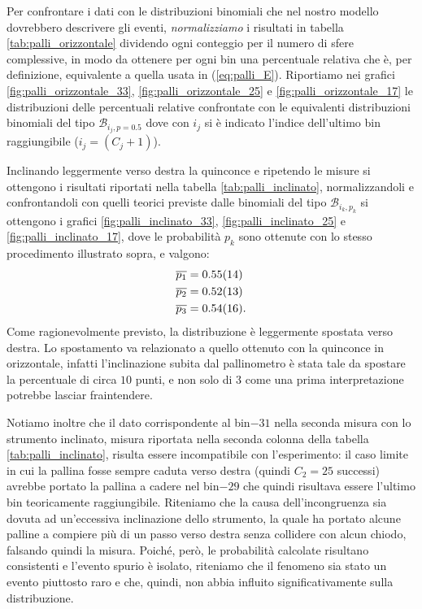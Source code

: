 \documentclass[10pt,oneside,a4paper]{article}
\begin{document}
Per confrontare i dati con le distribuzioni binomiali che nel nostro modello dovrebbero descrivere gli eventi, \emph{normalizziamo} i risultati in tabella \ref{tab:palli_orizzontale} dividendo ogni conteggio per il numero di sfere complessive, in modo da ottenere per ogni bin una percentuale relativa che è, per definizione, equivalente a quella usata in (\ref{eq:palli_E}). Riportiamo nei grafici \ref{fig:palli_orizzontale_33}, \ref{fig:palli_orizzontale_25} e \ref{fig:palli_orizzontale_17} le distribuzioni delle percentuali relative confrontate con le equivalenti distribuzioni binomiali del tipo $\mathscr{B}_{i_j, p=0.5}$ dove con $i_j$ si è indicato l'indice dell'ultimo bin raggiungibile ($i_j = (C_j+1)$).

Inclinando leggermente verso destra la quinconce e ripetendo le misure si ottengono i risultati riportati nella tabella \ref{tab:palli_inclinato}, normalizzandoli e confrontandoli con quelli teorici previste dalle binomiali del tipo $\mathscr{B}_{i_k, p_k}$ si ottengono i grafici \ref{fig:palli_inclinato_33}, \ref{fig:palli_inclinato_25} e \ref{fig:palli_inclinato_17}, dove le probabilità $p_k$ sono ottenute con lo stesso procedimento illustrato sopra, e valgono:
\begin{align*}
	& \overline{p_1} = \SI{0.55 \pm 0.14}{} \\ 
	& \overline{p_2} = \SI{0.52 \pm 0.13}{} \\
	& \overline{p_3} = \SI{0.54 \pm 0.16}{}.
\end{align*}
Come ragionevolmente previsto, la distribuzione è leggermente spostata verso destra. Lo spostamento va relazionato a quello ottenuto con la quinconce in orizzontale, infatti l'inclinazione subita dal pallinometro è stata tale da spostare la percentuale di circa $10$ punti, e non solo di $3$ come una prima interpretazione potrebbe lasciar fraintendere.

Notiamo inoltre che il dato corrispondente al bin$-31$ nella seconda misura con lo strumento inclinato, misura riportata nella seconda colonna della tabella \ref{tab:palli_inclinato}, risulta essere incompatibile con l'esperimento: il caso limite in cui la pallina fosse sempre caduta verso destra (quindi $C_2 = 25$ successi) avrebbe portato la pallina a cadere nel bin$-29$ che quindi risultava essere l'ultimo bin teoricamente raggiungibile. Riteniamo che la causa dell'incongruenza sia dovuta ad un'eccessiva inclinazione dello strumento, la quale ha portato alcune palline a compiere più di un passo verso destra senza collidere con alcun chiodo, falsando quindi la misura. Poiché, però, le probabilità calcolate risultano consistenti e l'evento spurio è isolato, riteniamo che il fenomeno sia stato un evento piuttosto raro e che, quindi, non abbia influito significativamente  sulla distribuzione. 
\end{document}
